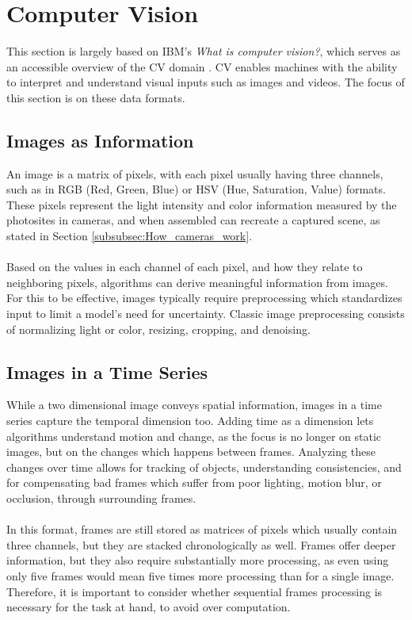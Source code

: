 \section{Computer Vision}
This section is largely based on IBM's \textit{What is computer vision?}, which serves as an accessible overview of the \acf{CV} domain \cite{IBM2025computerVision}. \acs{CV} enables machines with the ability to interpret and understand visual inputs such as images and videos. The focus of this section is on these data formats. 

\subsection{Images as Information}
An image is a matrix of pixels, with each pixel usually having three channels, such as in RGB (Red, Green, Blue) or HSV (Hue, Saturation, Value) formats. These pixels represent the light intensity and color information measured by the photosites in cameras, and when assembled can recreate a captured scene, as stated in Section \ref{subsubsec:How_cameras_work}. 
\\\\
Based on the values in each channel of each pixel, and how they relate to neighboring pixels, algorithms can derive meaningful information from images. For this to be effective, images typically require preprocessing which standardizes input to limit a model’s need for uncertainty. Classic image preprocessing consists of normalizing light or color, resizing, cropping, and denoising.  

\subsection{Images in a Time Series}
\label{subsec:images_in_a_time_series}
While a two dimensional image conveys spatial information, images in a time series capture the temporal dimension too. Adding time as a dimension lets algorithms understand motion and change, as the focus is no longer on static images, but on the changes which happens between frames. Analyzing these changes over time allows for tracking of objects, understanding consistencies, and for compensating bad frames which suffer from poor lighting, motion blur, or occlusion, through surrounding frames. 
\\\\
In this format, frames are still stored as matrices of pixels which usually contain three channels, but they are stacked chronologically as well. Frames offer deeper information, but they also require substantially more processing, as even using only five frames would mean five times more processing than for a single image. Therefore, it is important to consider whether sequential frames processing is necessary for the task at hand, to avoid over computation. 


